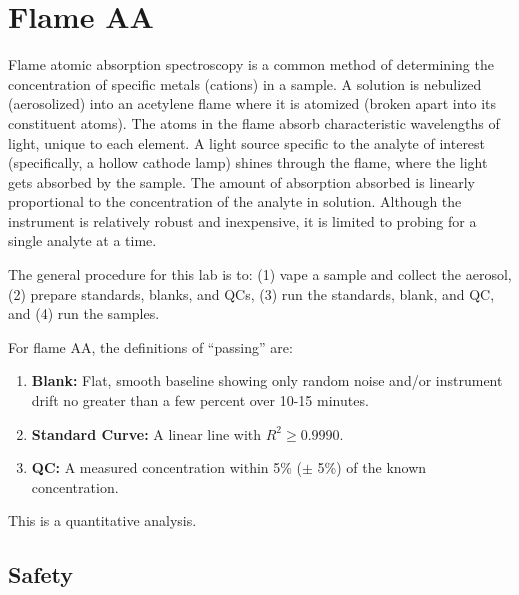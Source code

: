 \documentclass[]{tufte-book}
\providecommand{\tightlist}{%
  \setlength{\itemsep}{0pt}\setlength{\parskip}{0pt}}
\begin{document}
\newpage

\hypertarget{flame-aa}{%
\section{Flame AA}\label{flame-aa}}

Flame atomic absorption spectroscopy is a common method of determining the concentration of specific metals (cations) in a sample. A solution is nebulized (aerosolized) into an acetylene flame where it is atomized (broken apart into its constituent atoms). The atoms in the flame absorb characteristic wavelengths of light, unique to each element. A light source specific to the analyte of interest (specifically, a hollow cathode lamp) shines through the flame, where the light gets absorbed by the sample. The amount of absorption absorbed is linearly proportional to the concentration of the analyte in solution. Although the instrument is relatively robust and inexpensive, it is limited to probing for a single analyte at a time.

The general procedure for this lab is to: (1) vape a sample and collect the aerosol, (2) prepare standards, blanks, and QCs, (3) run the standards, blank, and QC, and (4) run the samples.

For flame AA, the definitions of ``passing'' are:

\begin{enumerate}
\def\labelenumi{\arabic{enumi}.}
\tightlist
\item
  \textbf{Blank:} Flat, smooth baseline showing only random noise and/or instrument drift no greater than a few percent over 10-15 minutes.\\
\item
  \textbf{Standard Curve:} A linear line with \(R^2 \ge 0.9990\).\\
\item
  \textbf{QC:} A measured concentration within 5\% (\(\pm\) 5\%) of the known concentration.
\end{enumerate}

This is a quantitative analysis.

\hypertarget{safety-2}{%
\subsection*{Safety}\label{safety-2}}
\end{document}
